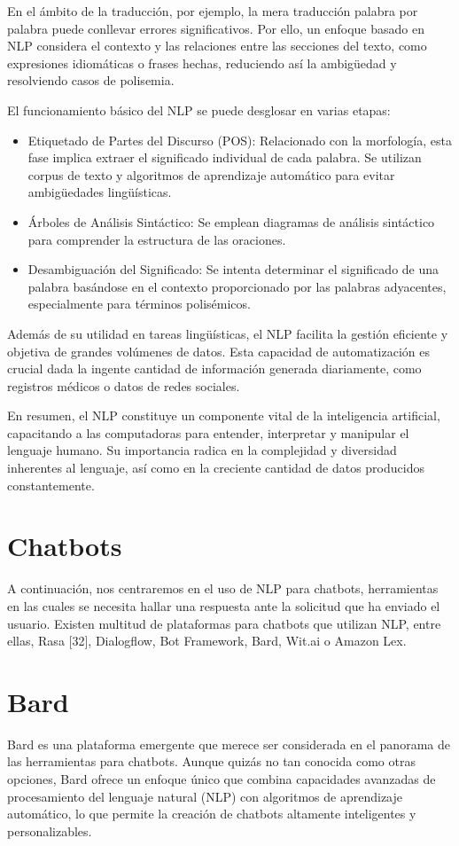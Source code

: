 En el ámbito de la traducción, por ejemplo, la mera traducción palabra por palabra puede conllevar errores significativos. Por ello, un enfoque basado en NLP considera el contexto y las relaciones entre las secciones del texto, como expresiones idiomáticas o frases hechas, reduciendo así la ambigüedad y resolviendo casos de polisemia.

El funcionamiento básico del NLP se puede desglosar en varias etapas:
\begin{itemize}
\item Etiquetado de Partes del Discurso (POS): Relacionado con la morfología, esta fase implica extraer el significado individual de cada palabra. Se utilizan corpus de texto y algoritmos de aprendizaje automático para evitar ambigüedades lingüísticas.
\item Árboles de Análisis Sintáctico: Se emplean diagramas de análisis sintáctico para comprender la estructura de las oraciones.
\item Desambiguación del Significado: Se intenta determinar el significado de una palabra basándose en el contexto proporcionado por las palabras adyacentes, especialmente para términos polisémicos.
\end{itemize}
Además de su utilidad en tareas lingüísticas, el NLP facilita la gestión eficiente y objetiva de grandes volúmenes de datos. Esta capacidad de automatización es crucial dada la ingente cantidad de información generada diariamente, como registros médicos o datos de redes sociales.

En resumen, el NLP constituye un componente vital de la inteligencia artificial, capacitando a las computadoras para entender, interpretar y manipular el lenguaje humano. Su importancia radica en la complejidad y diversidad inherentes al lenguaje, así como en la creciente cantidad de datos producidos constantemente.
\section{Chatbots}
A continuación, nos centraremos en el uso de NLP para chatbots, herramientas en las cuales se necesita hallar una respuesta ante la solicitud que ha enviado el usuario. Existen multitud de plataformas para chatbots que utilizan NLP, entre ellas, Rasa [32], Dialogflow, Bot Framework, Bard, Wit.ai o Amazon Lex.
\section{Bard}
Bard es una plataforma emergente que merece ser considerada en el panorama de las herramientas para chatbots. Aunque quizás no tan conocida como otras opciones, Bard ofrece un enfoque único que combina capacidades avanzadas de procesamiento del lenguaje natural (NLP) con algoritmos de aprendizaje automático, lo que permite la creación de chatbots altamente inteligentes y personalizables.

